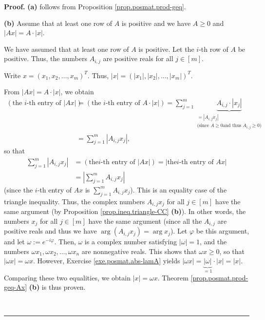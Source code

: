 \documentclass[numbers=enddot,12pt,final,onecolumn,notitlepage]{scrartcl}%
\numberwithin{exer}{subsection}
\theoremstyle{definition}
\newenvironment{proof}[1][Proof]{\noindent\textbf{#1.} }{\ \rule{0.5em}{0.5em}}
\let\sumnonlimits\sum
\renewcommand{\sum}{\sumnonlimits\limits}
\begin{document}
\begin{proof}
\textbf{(a)} follows from Proposition \ref{prop.posmat.prod-geq}. \medskip

\textbf{(b)} Assume that at least one row of $A$ is positive and we have
$A\geq0$ and $\left\vert Ax\right\vert =A\cdot\left\vert x\right\vert $.

We have assumed that at least one row of $A$ is positive. Let the $i$-th row
of $A$ be positive. Thus, the numbers $A_{i,j}$ are positive reals for all
$j\in\left[  m\right]  $.

Write $x=\left(  x_{1},x_{2},\ldots,x_{m}\right)  ^{T}$. Thus, $\left\vert
x\right\vert =\left(  \left\vert x_{1}\right\vert ,\left\vert x_{2}\right\vert
,\ldots,\left\vert x_{m}\right\vert \right)  ^{T}$.

From $\left\vert Ax\right\vert =A\cdot\left\vert x\right\vert $, we obtain%
\begin{align*}
\left(  \text{the }i\text{-th entry of }\left\vert Ax\right\vert \right)   &
=\left(  \text{the }i\text{-th entry of }A\cdot\left\vert x\right\vert
\right)  =\sum_{j=1}^{m}\underbrace{A_{i,j}\cdot\left\vert x_{j}\right\vert
}_{\substack{=\left\vert A_{i,j}x_{j}\right\vert \\\text{(since }A\geq0\text{
and thus }A_{i,j}\geq0\text{)}}}\\
&  =\sum_{j=1}^{m}\left\vert A_{i,j}x_{j}\right\vert ,
\end{align*}
so that
\begin{align*}
\sum_{j=1}^{m}\left\vert A_{i,j}x_{j}\right\vert  &  =\left(  \text{the
}i\text{-th entry of }\left\vert Ax\right\vert \right)  =\left\vert \text{the
}i\text{-th entry of }Ax\right\vert \\
&  =\left\vert \sum_{j=1}^{m}A_{i,j}x_{j}\right\vert
\end{align*}
(since the $i$-th entry of $Ax$ is $\sum_{j=1}^{m}A_{i,j}x_{j}$). This is an
equality case of the triangle inequality. Thus, the complex numbers
$A_{i,j}x_{j}$ for all $j\in\left[  m\right]  $ have the same argument (by
Proposition \ref{prop.ineq.triangle-CC} \textbf{(b)}). In other words, the
numbers $x_{j}$ for all $j\in\left[  m\right]  $ have the same argument (since
all the $A_{i,j}$ are positive reals and thus we have $\arg\left(
A_{i,j}x_{j}\right)  =\arg x_{j}$). Let $\varphi$ be this argument, and let
$\omega:=e^{-i\varphi}$. Then, $\omega$ is a complex number satisfying
$\left\vert \omega\right\vert =1$, and the numbers $\omega x_{1},\omega
x_{2},\ldots,\omega x_{n}$ are nonnegative reals. This shows that $\omega
x\geq0$, so that $\left\vert \omega x\right\vert =\omega x$. However, Exercise
\ref{exe.posmat.abs-lamA} yields $\left\vert \omega x\right\vert
=\underbrace{\left\vert \omega\right\vert }_{=1}\cdot\left\vert x\right\vert
=\left\vert x\right\vert $. Comparing these two equalities, we obtain
$\left\vert x\right\vert =\omega x$. Theorem \ref{prop.posmat.prod-geq-Ax}
\textbf{(b)} is thus proven. \medskip


\end{proof}
\end{document}

